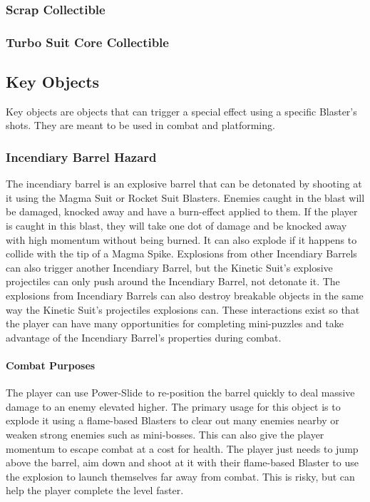\documentclass[12pt]{article}
\begin{document}
\subsubsection{Scrap Collectible}

\subsubsection{Turbo Suit Core Collectible}

\subsection{Key Objects}

Key objects are objects that can trigger a special effect using a specific Blaster's shots. They are meant to be used in combat and platforming.

\subsubsection{Incendiary Barrel Hazard}

The incendiary barrel is an explosive barrel that can be detonated by shooting at it using the Magma Suit or Rocket Suit Blasters. Enemies caught in the blast will be damaged, knocked away and have a burn-effect applied to them. If the player is caught in this blast, they will take one dot of damage and be knocked away with high momentum without being burned. It can also explode if it happens to collide with the tip of a Magma Spike. Explosions from other Incendiary Barrels can also trigger another Incendiary Barrel, but the Kinetic Suit's explosive projectiles can only push around the Incendiary Barrel, not detonate it. The explosions from Incendiary Barrels can also destroy breakable objects in the same way the Kinetic Suit's projectiles explosions can. These interactions exist so that the player can have many opportunities for completing mini-puzzles and take advantage of the Incendiary Barrel's properties during combat. 

\paragraph{Combat Purposes}

The player can use Power-Slide to re-position the barrel quickly to deal massive damage to an enemy elevated higher. The primary usage for this object is to explode it using a flame-based Blasters to clear out many enemies nearby or weaken strong enemies such as mini-bosses. This can also give the player momentum to escape combat at a cost for health. The player just needs to jump above the barrel, aim down and shoot at it with their flame-based Blaster to use the explosion to launch themselves far away from combat. This is risky, but can help the player complete the level faster. 
\end{document}
